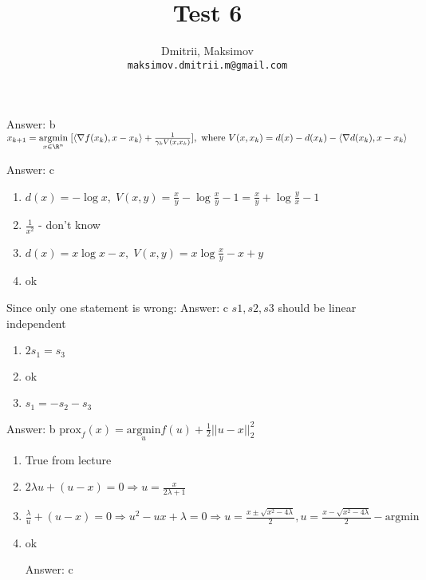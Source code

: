 \documentclass{homework}
\title{Test 6}
\author{
  Dmitrii, Maksimov\\
  \texttt{maksimov.dmitrii.m@gmail.com}
}
\begin{document}
\maketitle

\exercise
Answer: b
\exercise*
$x_{k+1} = \underset{x\in\R^n}{\mathrm{argmin}}\; [\langle \nabla f(x_k), x-x_k\rangle + \frac{1}{\gamma_kV(x,x_k)}], \text{ where }V(x,x_k) = d(x) - d(x_k) - \langle\nabla d(x_k), x-x_k \rangle$

Answer: c
\exercise*
\begin{enumerate}[label=(\alph*)]
 \item$d(x) = -\log x,\; V(x, y) = \frac{x}{y} -\log\frac{x}{y} - 1 = \frac{x}{y} +\log\frac{y}{x} - 1$
 \item $\frac{1}{x^2}$ - don't know
 \item$d(x) = x\log x-x,\; V(x, y) = x\log\frac{x}{y} - x + y$
 \item ok
\end{enumerate}
Since only one statement is wrong:\newline
Answer: c
\exercise*
$s1, s2, s3$ should be linear independent
\begin{enumerate}[label=(\alph*)]
	\item $2s_1=s_3$
	\item ok
	\item $s_1=-s_2-s_3$
\end{enumerate}
 Answer: b
\exercise*
$\mathrm{prox}_f(x)=\underset{u}{\mathrm{argmin}}f(u) + \frac{1}{2}||u-x||^2_2$
\begin{enumerate}[label=(\alph*)]
	\item True from lecture
	\item $2\lambda u + (u-x) = 0 \Rightarrow u=\frac{x}{2\lambda+1}$
	\item $\frac{\lambda}{u}+ (u-x) = 0 \Rightarrow u^2 - ux + \lambda = 0 \Rightarrow  u = \frac{x\pm\sqrt{x^2 -4 \lambda}}{2}, u = \frac{x-\sqrt{x^2 -4 \lambda}}{2} - \mathrm{argmin}$
	\item ok

Answer: c
\end{enumerate}
\end{document}
